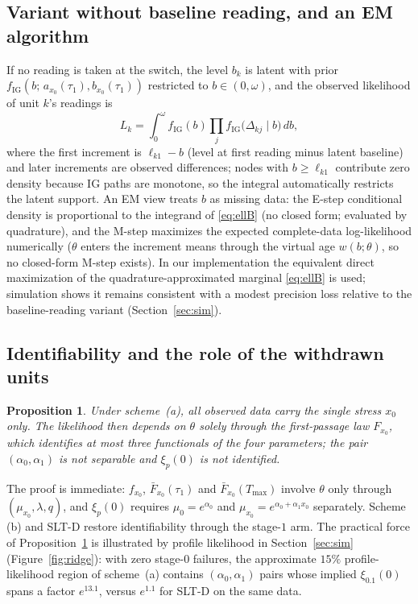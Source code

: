 \documentclass[11pt]{article}
\newtheorem{proposition}{Proposition}
\newcommand{\tmax}{T_{\max}}
\newcommand{\SLTD}{SLT-D}
\begin{document}
\subsection{Variant without baseline reading, and an EM algorithm}\label{sec:em}

If no reading is taken at the switch, the level $b_k$ is latent with prior
$f_{\mathrm{IG}}(b;\,a_{x_0}(\tau_1),b_{x_0}(\tau_1))$ restricted to $b\in(0,\omega)$, and the
observed likelihood of unit $k$'s readings is
\begin{equation}\label{eq:ellB}
L_k=\int_0^{\omega} f_{\mathrm{IG}}(b)\prod_{j}
f_{\mathrm{IG}}\big(\Delta_{kj}\mid b\big)\,db,
\end{equation}
where the first increment is $\ell_{k1}-b$ (level at first reading minus latent baseline) and
later increments are observed differences; nodes with $b\ge \ell_{k1}$ contribute zero density
because IG paths are monotone, so the integral automatically restricts the latent support. An EM
view treats $b$ as missing data: the E-step conditional density is proportional to the integrand
of \eqref{eq:ellB} (no closed form; evaluated by quadrature), and the M-step maximizes the
expected complete-data log-likelihood numerically ($\theta$ enters the increment means through
the virtual age $w(b;\theta)$, so no closed-form M-step exists). In our implementation the
equivalent direct maximization of the quadrature-approximated marginal \eqref{eq:ellB} is used;
simulation shows it remains consistent with a modest precision loss relative to the
baseline-reading variant (Section~\ref{sec:sim}).

\subsection{Identifiability and the role of the withdrawn units}\label{sec:ident}

\begin{proposition}\label{prop:ident}
Under scheme~(a), all observed data carry the single stress $x_0$ only. The likelihood then
depends on $\theta$ solely through the first-passage law $F_{x_0}$, which identifies at most
three functionals of the four parameters; the pair $(\alpha_0,\alpha_1)$ is not separable and
$\xi_p(0)$ is not identified.
\end{proposition}

The proof is immediate: $f_{x_0}$, $\bar F_{x_0}(\tau_1)$ and $\bar F_{x_0}(\tmax)$ involve
$\theta$ only through $(\mu_{x_0},\lambda,q)$, and $\xi_p(0)$ requires $\mu_{0}=e^{\alpha_0}$
and $\mu_{x_0}=e^{\alpha_0+\alpha_1 x_0}$ separately. Scheme (b) and \SLTD{} restore
identifiability through the stage-$1$ arm. The practical force of Proposition~\ref{prop:ident}
is illustrated by profile likelihood in Section~\ref{sec:sim} (Figure~\ref{fig:ridge}): with
zero stage-0 failures, the approximate $15\%$ profile-likelihood region of scheme~(a) contains
$(\alpha_0,\alpha_1)$ pairs whose implied $\xi_{0.1}(0)$ spans a factor $e^{13.1}$, versus
$e^{1.1}$ for \SLTD{} on the same data.
\end{document}
